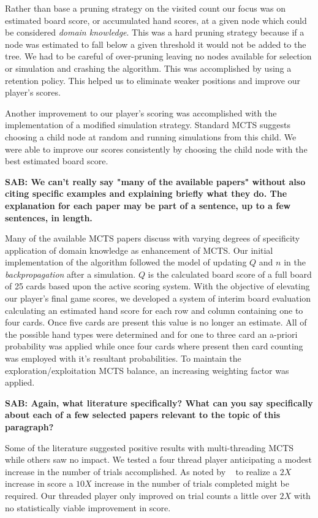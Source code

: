 \documentclass[letterpaper]{article}
\begin{document}
Rather than base a pruning strategy on the visited count our focus was on estimated board score, or accumulated hand scores, at a given node which could be considered \emph{domain knowledge}. This was a hard pruning strategy because if a node was estimated to fall below a given threshold it would not be added to the tree. We had to be careful of over-pruning leaving no nodes available for selection or simulation and crashing the algorithm. This was accomplished by using a retention policy. This helped us to eliminate weaker positions and improve our player's scores.

Another improvement to our player's scoring was accomplished with the implementation of a modified simulation strategy. Standard MCTS suggests choosing a child node at random and running simulations from this child. We were able to improve our scores consistently by choosing the child node with the best estimated board score.

{\bf SAB: We can't really say "many of the available papers" without also citing specific examples and explaining briefly what they do. The explanation for each paper may be part of a sentence, up to a few sentences, in length.}

Many of the available MCTS papers discuss with varying degrees of specificity application of domain knowledge as enhancement of MCTS. Our initial implementation of the algorithm followed the model of updating $Q$ and $n$ in the \emph{backpropagation} after a simulation. $Q$ is the calculated board score of a full board of 25 cards based upon the active scoring system. With the objective of elevating our player's final game scores, we developed a system of interim board evaluation calculating an estimated hand score for each row and column containing one to four cards. Once five cards are present this value is no longer an estimate. All of the possible hand types were determined and for one to three card an a-priori probability was applied while once four cards where present then card counting was employed with it's resultant probabilities. To maintain the exploration/exploitation MCTS balance, an increasing weighting factor was applied.

{\bf SAB: Again, what literature specifically? What can you say specifically about each of a few selected papers relevant to the topic of this paragraph?}

Some of the literature suggested positive results with multi-threading MCTS while others saw no impact. We tested a four thread player anticipating a modest increase in the number of trials accomplished. As noted by ~\cite{browne2010monte} to realize a $2X$ increase in score a $10X$ increase in the number of trials completed might be required. Our threaded player only improved on trial counts a little over $2X$ with no statistically viable improvement in score.
\end{document}
